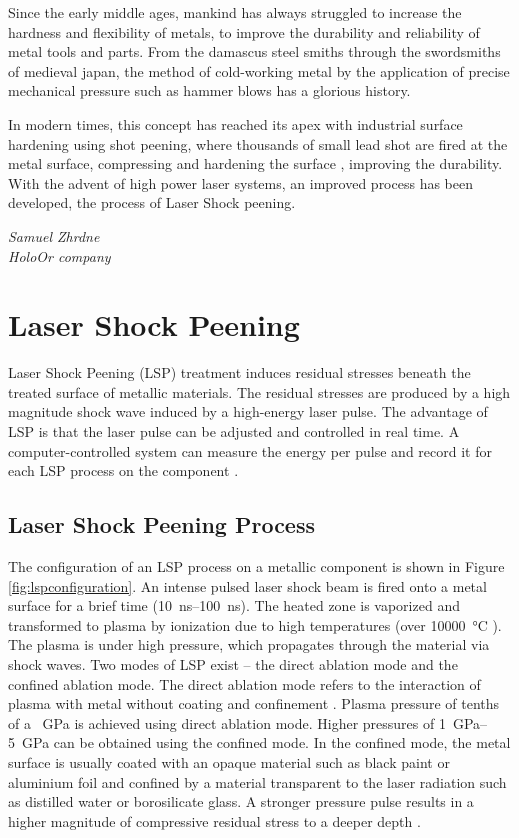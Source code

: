 \epigraph{Since the early middle ages, mankind has always struggled to increase the hardness and flexibility of metals, to improve the durability and reliability of  metal tools and parts. From the damascus steel smiths through the swordsmiths of medieval japan, the method of cold-working metal by the application of precise mechanical pressure such as hammer blows has a glorious history.

In modern times, this concept has reached its apex with industrial surface hardening using shot peening, where thousands of small lead shot are fired at the metal surface, compressing and hardening the surface , improving the durability. With the advent of high power laser systems, an improved process has been developed, the process of Laser Shock peening.}{\textit{Samuel Zhrdne\\ HoloOr company}}

\section{Laser Shock Peening}

Laser Shock Peening (LSP) treatment induces residual stresses beneath the treated surface of metallic materials. The residual stresses are produced by a high magnitude shock wave induced by a high-energy laser pulse. The advantage of LSP is that the laser pulse can be adjusted and controlled in real time. A computer-controlled system can measure the energy per pulse and record it for each LSP process on the component \cite{mannava}.

\subsection{Laser Shock Peening Process}
The configuration of an LSP process on a metallic component is shown in Figure \ref{fig:lspconfiguration}. An intense pulsed laser shock beam is fired onto a metal surface for a brief time (\SIrange{10}{100}{\ns}). The heated zone is vaporized and transformed to plasma by ionization due to high temperatures (over \SI{10000}{\degreeCelsius} ). The plasma is under high pressure, which propagates through the material via shock waves. Two modes of LSP exist – the direct ablation mode and the confined ablation mode. The direct ablation mode refers to the interaction of plasma with metal without coating and confinement \cite{sano}. Plasma pressure of tenths of a \SI{}{\GPa} is achieved using direct ablation mode. Higher pressures of \SIrange{1}{5}{\GPa} can be obtained using the confined mode. In the confined mode, the metal surface is usually coated with an opaque material such as black paint or aluminium foil and confined by a material transparent to the laser radiation such as distilled water or borosilicate glass. A stronger pressure pulse results in a higher magnitude of compressive residual stress to a deeper depth \cite{fairland}.

